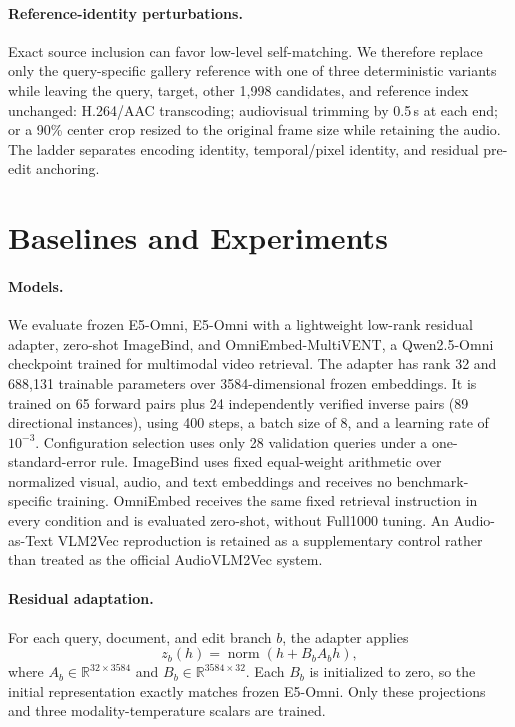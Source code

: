 \documentclass[letterpaper]{article}
\begin{document}
\paragraph{Reference-identity perturbations.}
Exact source inclusion can favor low-level self-matching.
We therefore replace only the query-specific gallery reference with one of three deterministic variants while leaving the query, target, other 1,998 candidates, and reference index unchanged: H.264/AAC transcoding; audiovisual trimming by 0.5\,s at each end; or a 90\% center crop resized to the original frame size while retaining the audio.
The ladder separates encoding identity, temporal/pixel identity, and residual pre-edit anchoring.

\section{Baselines and Experiments}

\paragraph{Models.}
We evaluate frozen E5-Omni, E5-Omni with a lightweight low-rank residual adapter, zero-shot ImageBind, and OmniEmbed-MultiVENT, a Qwen2.5-Omni checkpoint trained for multimodal video retrieval. The adapter has rank 32 and 688,131 trainable parameters over 3584-dimensional frozen embeddings. It is trained on 65 forward pairs plus 24 independently verified inverse pairs (89 directional instances), using 400 steps, a batch size of 8, and a learning rate of $10^{-3}$. Configuration selection uses only 28 validation queries under a one-standard-error rule. ImageBind uses fixed equal-weight arithmetic over normalized visual, audio, and text embeddings and receives no benchmark-specific training. OmniEmbed receives the same fixed retrieval instruction in every condition and is evaluated zero-shot, without Full1000 tuning. An Audio-as-Text VLM2Vec reproduction is retained as a supplementary control rather than treated as the official AudioVLM2Vec system.

\paragraph{Residual adaptation.}
For each query, document, and edit branch $b$, the adapter applies
\begin{equation}
  z_b(h)=\operatorname{norm}\!\left(h+B_b A_b h\right),
\end{equation}
where $A_b\!\in\!\mathbb{R}^{32\times3584}$ and
$B_b\!\in\!\mathbb{R}^{3584\times32}$.
Each $B_b$ is initialized to zero, so the initial representation exactly matches frozen E5-Omni.
Only these projections and three modality-temperature scalars are trained.
\end{document}
